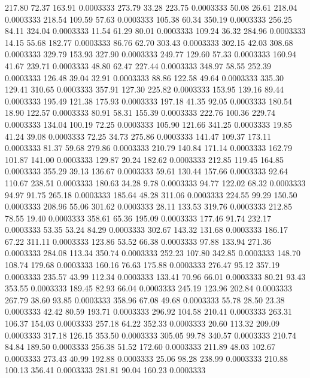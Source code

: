  217.80   72.37  163.91   0.0003333
 273.79   33.28  223.75   0.0003333
  50.08   26.61  218.04   0.0003333
 218.54  109.59   57.63   0.0003333
 105.38   60.34  350.19   0.0003333
 256.25   84.11  324.04   0.0003333
  11.54   61.29   80.01   0.0003333
 109.24   36.32  284.96   0.0003333
  14.15   55.68  182.77   0.0003333
  86.76   62.70  303.43   0.0003333
 302.15   42.03  308.68   0.0003333
 329.79  153.93  327.90   0.0003333
 249.77  129.60   57.33   0.0003333
 160.94   41.67  239.71   0.0003333
  48.80   62.47  227.44   0.0003333
 348.97   58.55  252.39   0.0003333
 126.48   39.04   32.91   0.0003333
  88.86  122.58   49.64   0.0003333
 335.30  129.41  310.65   0.0003333
 357.91  127.30  225.82   0.0003333
 153.95  139.16   89.44   0.0003333
 195.49  121.38  175.93   0.0003333
 197.18   41.35   92.05   0.0003333
 180.54   18.90  122.57   0.0003333
  80.91   58.31  155.39   0.0003333
 222.76  100.36  229.74   0.0003333
 134.04  100.19   72.25   0.0003333
 105.90  121.66  341.25   0.0003333
  19.85   41.24   39.08   0.0003333
  72.25   34.73  275.86   0.0003333
 141.47  109.37  173.11   0.0003333
  81.37   59.68  279.86   0.0003333
 210.79  140.84  171.14   0.0003333
 162.79  101.87  141.00   0.0003333
 129.87   20.24  182.62   0.0003333
 212.85  119.45  164.85   0.0003333
 355.29   39.13  136.67   0.0003333
  59.61  130.44  157.66   0.0003333
  92.64  110.67  238.51   0.0003333
 180.63   34.28    9.78   0.0003333
  94.77  122.02   68.32   0.0003333
  94.97   91.75  265.18   0.0003333
 185.64   48.28  311.06   0.0003333
 224.55   99.29  150.50   0.0003333
 208.96   55.06  301.62   0.0003333
  28.11  133.53  319.76   0.0003333
 212.85   78.55   19.40   0.0003333
 358.61   65.36  195.09   0.0003333
 177.46   91.74  232.17   0.0003333
  53.35   53.24   84.29   0.0003333
 302.67  143.32  131.68   0.0003333
 186.17   67.22  311.11   0.0003333
 123.86   53.52   66.38   0.0003333
  97.88  133.94  271.36   0.0003333
 284.08  113.34  350.74   0.0003333
 252.23  107.80  342.85   0.0003333
 148.70  108.74  179.68   0.0003333
 160.16   76.63  175.88   0.0003333
 276.47   95.12  357.19   0.0003333
 235.57   43.99  112.34   0.0003333
 133.41   70.96   66.01   0.0003333
  80.21   93.43  353.55   0.0003333
 189.45   82.93   66.04   0.0003333
 245.19  123.96  202.84   0.0003333
 267.79   38.60   93.85   0.0003333
 358.96   67.08   49.68   0.0003333
  55.78   28.50   23.38   0.0003333
  42.42   80.59  193.71   0.0003333
 296.92  104.58  210.41   0.0003333
 263.31  106.37  154.03   0.0003333
 257.18   64.22  352.33   0.0003333
  20.60  113.32  209.09   0.0003333
 317.18  126.15  353.50   0.0003333
 305.05   99.78  340.57   0.0003333
 210.74   84.84  189.50   0.0003333
 256.38   51.52  172.60   0.0003333
 211.89   48.03  102.67   0.0003333
 273.43   40.99  192.88   0.0003333
  25.06   98.28  238.99   0.0003333
 210.88  100.13  356.41   0.0003333
 281.81   90.04  160.23   0.0003333
